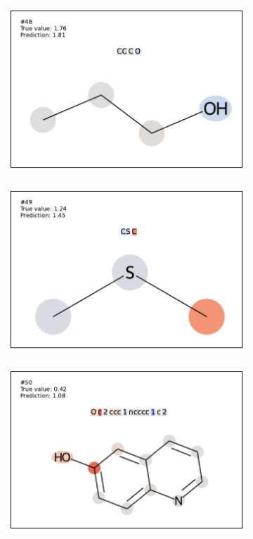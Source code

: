 \begin{figure}[h]
\begin{subfigure}[b]{0.33\textwidth}
\end{subfigure}
\begin{subfigure}[b]{0.33\textwidth} 
  \centering 
  \includegraphics[width=\textwidth]{figures/esol/esol48.pdf} 
\end{subfigure}\begin{subfigure}[b]{0.33\textwidth} 
  \centering 
  \includegraphics[width=\textwidth]{figures/esol/esol49.pdf} 
\end{subfigure}\begin{subfigure}[b]{0.33\textwidth} 
  \centering 
  \includegraphics[width=\textwidth]{figures/esol/esol50.pdf} 

\end{subfigure}
\end{figure}
